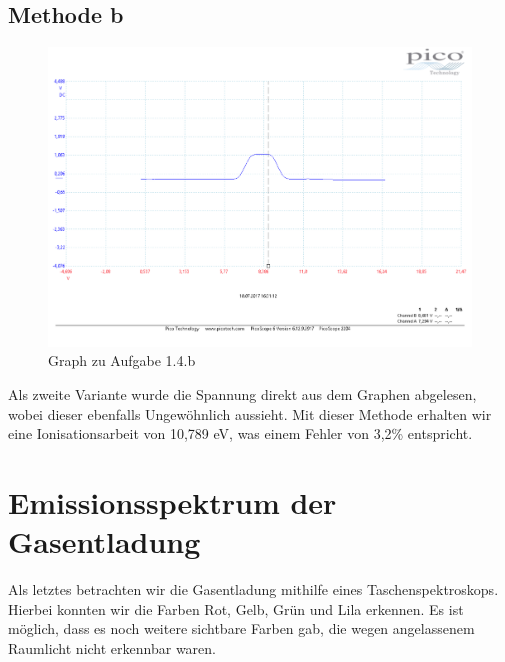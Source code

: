 \subsection{Methode b}
\begin{figure}
	\includegraphics[width=\textwidth]{../Daten/Aufgabe1/Frank_Hertz_1_4_b_2.pdf}
	\caption{Graph zu Aufgabe 1.4.b}
\end{figure}
Als zweite Variante wurde die Spannung direkt aus dem Graphen abgelesen, wobei dieser ebenfalls Ungewöhnlich aussieht. Mit dieser Methode erhalten wir eine Ionisationsarbeit von 10,789 eV, was einem Fehler von 3,2\% entspricht.
\section{Emissionsspektrum der Gasentladung}
Als letztes betrachten wir die Gasentladung mithilfe eines Taschenspektroskops. Hierbei konnten wir die Farben Rot, Gelb, Grün und Lila erkennen. Es ist möglich, dass es noch weitere sichtbare Farben gab, die wegen angelassenem Raumlicht nicht erkennbar waren.